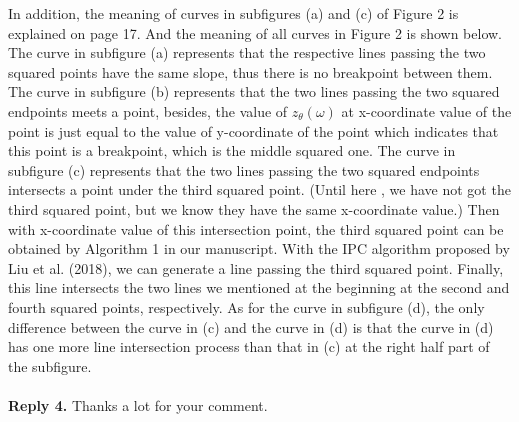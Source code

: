 \documentclass[11pt]{article}
\begin{document}
{In addition, the meaning of curves in subfigures (a) and (c) of Figure 2 is explained on page 17.
And the meaning of all curves in Figure 2 is shown below. The curve in subfigure (a) represents that the respective lines passing the two squared points have the same slope, thus there is no breakpoint between them.
The curve in subfigure (b) represents that the two lines passing the two squared endpoints meets a point, besides, the value of $z_\theta(\omega)$ at x-coordinate value of the point is just equal to the value of y-coordinate of the point which indicates that this point is a breakpoint, which is the middle squared one. The curve in subfigure (c) represents that the two lines passing the two squared endpoints intersects a point under the third squared point. (Until here , we have not got the third squared point, but we know they have the same x-coordinate value.) Then with x-coordinate value of this intersection point, the third squared point can be obtained by Algorithm 1 in our manuscript. With the IPC algorithm proposed by Liu et al. (2018), we can generate a line passing the third squared point. Finally, this line intersects the two lines we mentioned at the beginning at the second and fourth squared points, respectively.
As for the curve in subfigure (d), the only difference between the curve in (c) and the curve in (d) is that the curve in (d) has one more line intersection process than that in (c) at the right half part of the subfigure.
~\\[4mm]

~\\[2mm]

\noindent \textbf{Reply 4.}
Thanks a lot for your comment.

}
\end{document}
